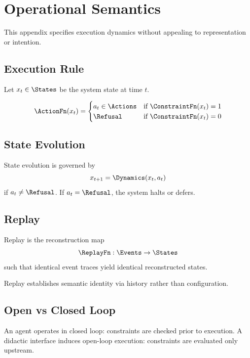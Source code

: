 \section{Operational Semantics}

This appendix specifies execution dynamics without appealing to representation or intention.

\subsection{Execution Rule}

Let $x_t \in \States$ be the system state at time $t$.

\[
\ActionFn(x_t) =
\begin{cases}
a_t \in \Actions & \text{if } \ConstraintFn(x_t) = 1 \\
\Refusal & \text{if } \ConstraintFn(x_t) = 0
\end{cases}
\]

\subsection{State Evolution}

\begin{definition}[Dynamics]
State evolution is governed by
\[
x_{t+1} = \Dynamics(x_t, a_t)
\]
if $a_t \neq \Refusal$. If $a_t = \Refusal$, the system halts or defers.
\end{definition}

\subsection{Replay}

\begin{definition}[Replay]
Replay is the reconstruction map
\[
\ReplayFn : \Events \to \States
\]
such that identical event traces yield identical reconstructed states.
\end{definition}

Replay establishes semantic identity via history rather than configuration.

\subsection{Open vs Closed Loop}

An agent operates in closed loop: constraints are checked prior to execution.  
A didactic interface induces open-loop execution: constraints are evaluated only upstream.

